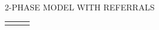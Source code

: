 \documentclass{beamer}
\begin{document}
\begin{frame}{2-PHASE MODEL WITH REFERRALS}
\begin{tabularx}{\linewidth}{C|CC}
    &  &  \\
  \end{tabularx}
\end{frame}
\end{document}
